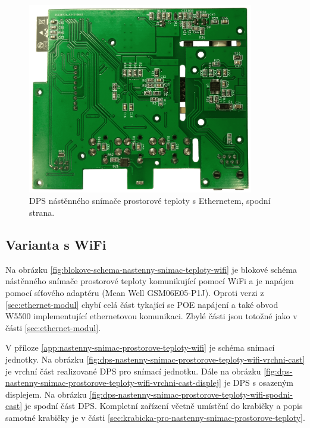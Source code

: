 \begin{figure}[H]
    \centering
    \includegraphics[width=0.88\textwidth]{images/nastenny-snimac-prostorove-teploty-ethernet/dps-nastenny-snimac-prostorove-teploty-ethernet-spodni-cast.png}
    \caption{DPS nástěnného snímače prostorové teploty s Ethernetem, spodní strana.}
    \label{fig:dps-nastenny-snimac-prostorove-teploty-ethernet-spodni-cast}
\end{figure}


\subsection{Varianta s WiFi}
\label{sec:wifi-modul}

Na obrázku \ref{fig:blokove-schema-nastenny-snimac-teploty-wifi} je blokové schéma nástěnného snímače prostorové teploty komunikující pomocí WiFi a je napájen pomocí síťového adaptéru (Mean Well GSM06E05-P1J). Oproti verzi z \ref{sec:ethernet-modul} chybí celá část tykající se POE napájení a také obvod W5500 implementující ethernetovou komunikaci. Zbylé části jsou totožné jako v části \ref{sec:ethernet-modul}.

V příloze \ref{app:nastenny-snimac-prostorove-teploty-wifi} je schéma snímací jednotky. Na obrázku \ref{fig:dps-nastenny-snimac-prostorove-teploty-wifi-vrchni-cast} je vrchní část realizované DPS pro snímací jednotku. Dále na obrázku \ref{fig:dps-nastenny-snimac-prostorove-teploty-wifi-vrchni-cast-displej} je DPS s osazeným displejem. Na obrázku \ref{fig:dps-nastenny-snimac-prostorove-teploty-wifi-spodni-cast} je spodní část DPS. Kompletní zařízení včetně umístění do krabičky a popis samotné krabičky je v části \ref{sec:krabicka-pro-nastenny-snimac-prostorove-teploty}.

